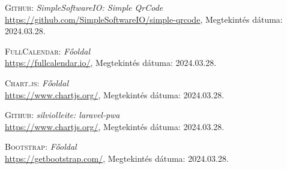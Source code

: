 \documentclass[
]{thesis-ekf}
\theoremstyle{definition}
\theoremstyle{remark}
\begin{document}
\begin{thebibliography}{19}
\textsc{Github}: \emph{SimpleSoftwareIO: Simple QrCode}
\\
\url{https://github.com/SimpleSoftwareIO/simple-qrcode}, Megtekintés dátuma: 2024.03.28.

\textsc{FullCalendar}: \emph{Főoldal}
\\
\url{https://fullcalendar.io/}, Megtekintés dátuma: 2024.03.28.

\textsc{Chart.js}: \emph{Főoldal}
\\
\url{https://www.chartjs.org/}, Megtekintés dátuma: 2024.03.28.

\textsc{Github}: \emph{silviolleite: laravel-pwa}
\\
\url{https://www.chartjs.org/}, Megtekintés dátuma: 2024.03.28.

\textsc{Bootstrap}: \emph{Főoldal}
\\
\url{https://getbootstrap.com/}, Megtekintés dátuma: 2024.03.28.

\end{thebibliography}


\end{document}
